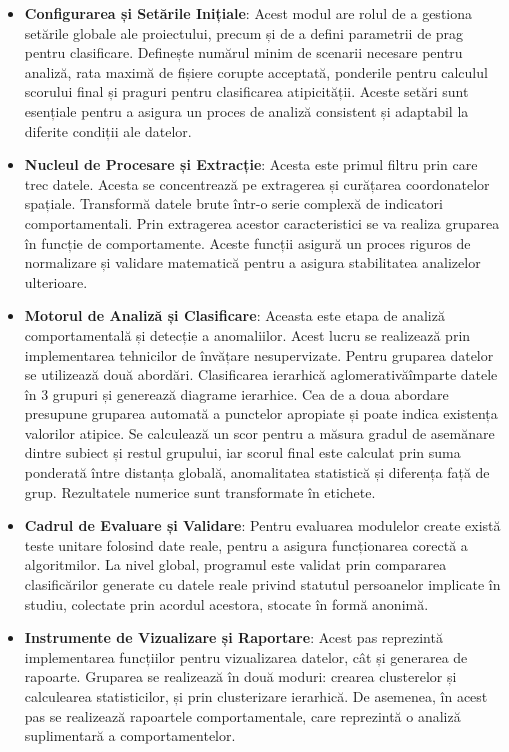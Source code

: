 \documentclass[12pt,a4paper]{report}
\theoremstyle{definition}
\theoremstyle{remark}
\begin{document}
\begin{itemize}
    \item \textbf{Configurarea și Setările Inițiale}: Acest modul are rolul de a gestiona setările globale ale proiectului, precum și de a defini parametrii de prag pentru clasificare. Definește numărul minim de scenarii necesare pentru analiză, rata maximă de fișiere corupte acceptată, ponderile pentru calculul scorului final și praguri pentru clasificarea atipicității. Aceste setări sunt esențiale pentru a asigura un proces de analiză consistent și adaptabil la diferite condiții ale datelor.
    \item \textbf{Nucleul de Procesare și Extracție}: Acesta este primul filtru prin care trec datele. Acesta se concentrează pe extragerea și curățarea coordonatelor spațiale. Transformă datele brute într-o serie complexă de indicatori comportamentali. Prin extragerea acestor caracteristici se va realiza gruparea în funcție de comportamente. Aceste funcții asigură un proces riguros de normalizare și validare matematică pentru a asigura stabilitatea analizelor ulterioare.
    \item \textbf{Motorul de Analiză și Clasificare}: Aceasta este etapa de analiză comportamentală și detecție a anomaliilor. Acest lucru se realizează prin implementarea tehnicilor de învățare nesupervizate. Pentru gruparea datelor se utilizează două abordări. Clasificarea ierarhică aglomerativăîmparte datele în 3 grupuri și generează diagrame ierarhice. Cea de a doua abordare presupune gruparea automată a punctelor apropiate și poate indica existența valorilor atipice. Se calculează un scor pentru a măsura gradul de asemănare dintre subiect și restul grupului, iar scorul final este calculat prin suma ponderată între distanța globală, anomalitatea statistică și diferența față de grup. Rezultatele numerice sunt transformate în etichete. 
    \item \textbf{Cadrul de Evaluare și Validare}: Pentru evaluarea modulelor create există teste unitare folosind date reale, pentru a asigura funcționarea corectă a algoritmilor. La nivel global, programul este validat prin compararea clasificărilor generate cu datele reale privind statutul persoanelor implicate în studiu, colectate prin acordul acestora, stocate în formă anonimă.
    \item \textbf{Instrumente de Vizualizare și Raportare}: Acest pas reprezintă implementarea funcțiilor pentru vizualizarea datelor, cât și generarea de rapoarte. Gruparea se realizează în două moduri: crearea clusterelor și calculearea statisticilor, și prin clusterizare ierarhică. De asemenea, în acest pas se realizează rapoartele comportamentale, care reprezintă o analiză suplimentară a comportamentelor.

\end{itemize}
\end{document}
